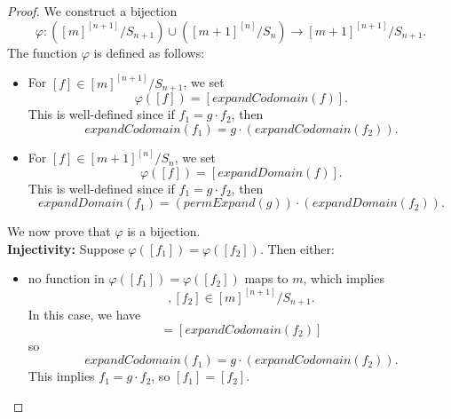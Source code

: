 \begin{proof}
  \leanok
  We construct a bijection 
  \begin{equation*}
    \varphi : \left([m]^{[n + 1]}/S_{n + 1}\right) \cup \left([m + 1]^{[n]}/S_n\right) \to [m + 1]^{[n + 1]}/S_{n + 1}.
  \end{equation*}
  The function $\varphi$ is defined as follows:
  \begin{itemize}
    \item For $[f] \in [m]^{[n + 1]}/S_{n + 1}$, we set
          \begin{equation*}
            \varphi([f]) = [\textit{expandCodomain}(f)].
          \end{equation*}
          This is well-defined since if $f_1 = g \cdot f_2$, then
          \begin{equation*}
            \textit{expandCodomain}(f_1) = g \cdot (\textit{expandCodomain}(f_2)).
          \end{equation*}
    
    \item For $[f] \in [m + 1]^{[n]}/S_n$, we set
          \begin{equation*}
            \varphi([f]) = [\textit{expandDomain}(f)].
          \end{equation*}
          This is well-defined since if $f_1 = g \cdot f_2$, then
          \begin{equation*}
            \textit{expandDomain}(f_1) = (\textit{permExpand}(g)) \cdot (\textit{expandDomain}(f_2)).
          \end{equation*}
  \end{itemize}
  We now prove that $\varphi$ is a bijection. \\
  \textbf{Injectivity:} Suppose $\varphi([f_1]) = \varphi([f_2])$. Then either:
  \begin{itemize}
    \item no function in $\varphi([f_1]) = \varphi([f_2])$ maps to $m$, which implies
          \begin{equation*}
            [f_1], [f_2] \in [m]^{[n + 1]}/S_{n + 1}.
          \end{equation*}
          In this case, we have
          \begin{equation*}
            [\textit{expandCodomain}(f_1)] = [\textit{expandCodomain}(f_2)]
          \end{equation*}
          so
          \begin{equation*}
            \textit{expandCodomain}(f_1) = g \cdot (\textit{expandCodomain}(f_2)).
          \end{equation*}
          This implies $f_1 = g \cdot f_2$, so $[f_1] = [f_2]$.


\end{itemize}
\end{proof}
